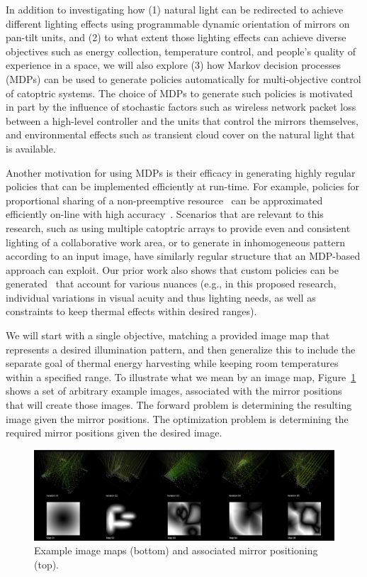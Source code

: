 In addition to investigating how (1) natural light can be redirected to achieve
different lighting effects using programmable dynamic orientation of mirrors on 
pan-tilt units, and (2) to what extent those lighting effects can achieve diverse
objectives such as energy collection, temperature control, and people's quality 
of experience in a space, we will also explore (3) how Markov decision processes 
(MDPs) can be used to generate policies automatically for multi-objective control of 
catoptric systems.  The choice of MDPs to generate such policies is motivated in part 
by the influence of stochastic factors such as wireless network packet loss between
a high-level controller and the units that control the mirrors themselves, and 
environmental effects such as transient cloud cover on the natural light that is 
available.

Another motivation for using MDPs is their efficacy in generating highly regular 
policies that can be implemented efficiently at run-time.  For example, policies for
proportional sharing of a non-preemptive resource~\cite{gtgs09,gtsg08} can be 
approximated efficiently on-line with high accuracy~\cite{gtspmgs10}.  Scenarios
that are relevant to this research, such as using multiple catoptric arrays to
provide even and consistent lighting of a collaborative work area, or to generate
in inhomogeneous pattern according to an input image, have similarly
regular structure that an MDP-based approach can exploit.  Our prior work also
shows that custom policies can be generated~\cite{tblwgs11,tggs10} that account 
for various nuances (e.g., in this proposed research, individual variations in 
visual acuity and thus lighting needs, as well as constraints to keep thermal 
effects within desired ranges).

We will start with a single objective, matching a provided image map that represents a 
desired illumination pattern, and then generalize this to include the separate goal of 
thermal energy harvesting while keeping room temperatures within a specified range.
To illustrate what we mean by an image map, Figure~\ref{fig:maps}
shows a set of arbitrary example images, associated with the mirror
positions that will create those images.  The forward problem is determining
the resulting image given the mirror positions.  The optimization problem
is determining the required mirror positions given the desired image.

\begin{figure}[ht]
\centering
\includegraphics[width=0.9\linewidth]{figures/maps}
\caption{Example image maps (bottom) and associated mirror positioning (top).}
\label{fig:maps}
\end{figure}

